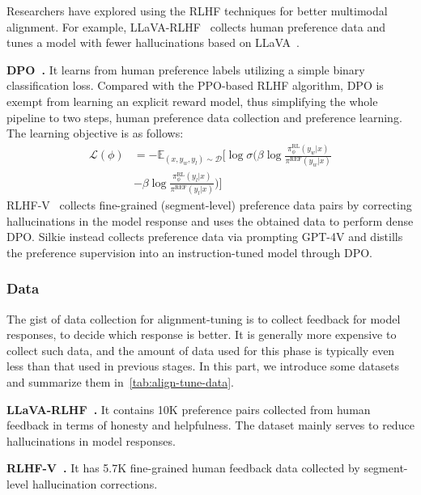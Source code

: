 Researchers have explored using the RLHF techniques for better multimodal alignment. For example, LLaVA-RLHF~\cite{sun2023aligning} collects human preference data and tunes a model with fewer hallucinations based on LLaVA~\cite{llava}.

\noindent \textbf{DPO~\cite{rafailov2023direct}.}
It learns from human preference labels utilizing a simple binary classification loss. Compared with the PPO-based RLHF algorithm, DPO is exempt from learning an explicit reward model, thus simplifying the whole pipeline to two steps, \ie human preference data collection and preference learning. The learning objective is as follows:
\begin{equation}
\begin{split}
    \mathcal{L}(\phi) &= -\mathbb{E}_{(x,y_w,y_l)\sim \mathcal{D}} \Big[ \log \sigma\Big( \beta \log \frac{\pi_\phi^{\text{RL}}(y_w|x)}{\pi^{\text{REF}}(y_w|x)} \\ 
    &- \beta \log \frac{\pi_\phi^{\text{RL}}(y_l|x)}{\pi^{\text{REF}}(y_l|x)} \Big)\Big]
\end{split}
\end{equation}
RLHF-V~\cite{yu2023rlhf} collects fine-grained (segment-level) preference data pairs by correcting hallucinations in the model response and uses the obtained data to perform dense DPO.
Silkie\cite{li2023silkie} instead collects preference data via prompting GPT-4V and distills the preference supervision into an instruction-tuned model through DPO.

\subsubsection{Data}
The gist of data collection for alignment-tuning is to collect feedback for model responses, \ie to decide which response is better. 
It is generally more expensive to collect such data, and the amount of data used for this phase is typically even less than that used in previous stages. 
In this part, we introduce some datasets and summarize them in~\cref{tab:align-tune-data}.

\noindent \textbf{LLaVA-RLHF~\cite{sun2023aligning}.}
It contains 10K preference pairs collected from human feedback in terms of honesty and helpfulness. The dataset mainly serves to reduce hallucinations in model responses.

\noindent \textbf{RLHF-V~\cite{yu2023rlhf}.}
It has 5.7K fine-grained human feedback data collected by segment-level hallucination corrections.

